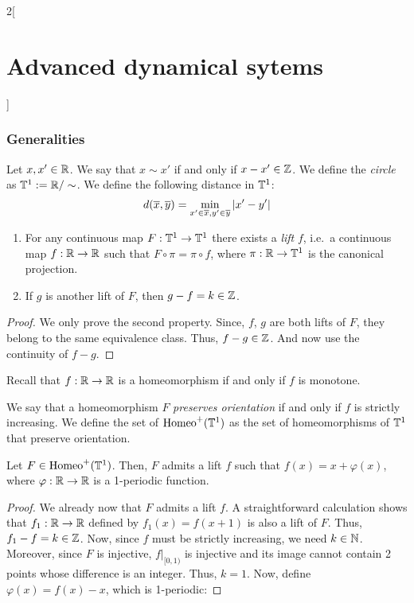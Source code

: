 \documentclass[../../../main_math.tex]{subfiles}
\begin{document}
\begin{multicols}{2}[\section{Advanced dynamical sytems}]
  \subsubsection{Generalities}
  \begin{definition}
    Let $x,x'\in\mathbb{R}$. We say that $x\sim x'$ if and only if $x-x'\in\mathbb{Z}$. We define the \emph{circle} as $\TT^1:=\quot{\RR}{\sim}$. We define the following distance in $\mathbb{T}^1$:
    $$
      d(\overline{x},\overline{y})=\min_{x'\in\overline{x},y'\in\overline{y}}\abs{x'-y'}
    $$
  \end{definition}
  \begin{proposition}\hfill
    \begin{enumerate}
      \item For any continuous map $F:\mathbb{T}^1\to \mathbb{T}^1$ there exists a \emph{lift} $f$, i.e.\ a continuous map $f:\mathbb{R}\to \mathbb{R}$ such that $F\circ \pi=\pi\circ f$, where $\pi:\mathbb{R}\to \mathbb{T}^1$ is the canonical projection.
      \item If $g$ is another lift of $F$, then $g-f=k\in\mathbb{Z}$.
    \end{enumerate}
  \end{proposition}
  \begin{proof}
    We only prove the second property. Since, $f$, $g$ are both lifts of $F$, they belong to the same equivalence class. Thus, $f-g\in\mathbb{Z}$. And now use the continuity of $f-g$.
  \end{proof}
  \begin{remark}
    Recall that $f:\mathbb{R}\to\mathbb{R}$ is a homeomorphism if and only if $f$ is monotone.
  \end{remark}
  \begin{definition}
    We say that a homeomorphism $F$ \emph{preserves orientation} if and only if $f$ is strictly increasing. We define the set of $\mathrm{Homeo}^+(\mathbb{T}^1)$ as the set of homeomorphisms of $\mathbb{T}^1$ that preserve orientation.
  \end{definition}
  \begin{proposition}
    Let $F\in\mathrm{Homeo}^+(\mathbb{T}^1)$. Then, $F$ admits a lift $f$ such that $f(x)=x+\varphi(x)$, where $\varphi:\mathbb{R}\to\mathbb{R}$ is a 1-periodic function.
  \end{proposition}
  \begin{proof}
    We already now that $F$ admits a lift $f$. A straightforward calculation shows that $f_1:\mathbb{R}\to\mathbb{R}$ defined by $f_1(x)=f(x+1)$ is also a lift of $F$. Thus, $f_1-f=k\in \mathbb{Z}$. Now, since $f$ must be strictly increasing, we need $k\in \mathbb{N}$. Moreover, since $F$ is injective, $f|_{[0,1)}$ is injective and its image cannot contain 2 points whose difference is an integer. Thus, $k=1$. Now, define $\varphi(x)=f(x)-x$, which is 1-periodic:

\end{proof}
\end{multicols}
\end{document}
